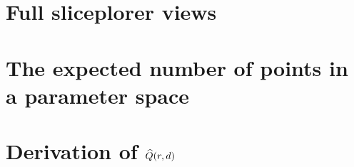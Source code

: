 \documentclass[a4paper,12pt]{memoir}
\begin{document}
\begin{appendices}

\chapter{Full sliceplorer views}
\label{app:sliceplorer_ml}


\chapter{The expected number of points in a parameter space}
\label{app:exppts}


\chapter{Derivation of $\widehat{Q}(r,d)$}
\label{app:expfrags}


\end{appendices}




\begin{abstract}

\end{abstract}

\begin{abstract}

\end{abstract}
\end{document}

